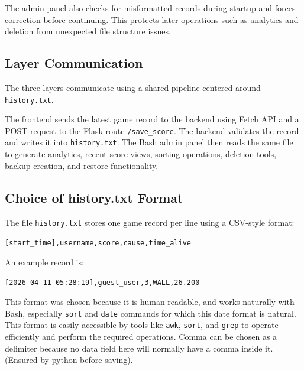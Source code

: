 \documentclass[12pt]{article}
\begin{document}
The admin panel also checks for misformatted records during startup and forces correction before continuing. This protects later operations such as analytics and deletion from unexpected file structure issues.

\subsection{Layer Communication}

The three layers communicate using a shared pipeline centered around \texttt{history.txt}.

The frontend sends the latest game record to the backend using Fetch API and a POST request to the Flask route \texttt{/save\_score}. The backend validates the record and writes it into \texttt{history.txt}. The Bash admin panel then reads the same file to generate analytics, recent score views, sorting operations, deletion tools, backup creation, and restore functionality.

\subsection{Choice of history.txt Format}

The file \texttt{history.txt} stores one game record per line using a CSV-style format:

\texttt{[start\_time],username,score,cause,time\_alive}

An example record is:

\texttt{[2026-04-11 05:28:19],guest\_user,3,WALL,26.200}

This format was chosen because it is human-readable, and works naturally with Bash, especially \texttt{sort} and \texttt{date} commands for which this date format is natural. This format is easily accessible by tools like \texttt{awk}, \texttt{sort}, and \texttt{grep} to operate efficiently and perform the required operations. Comma can be chosen as a delimiter because no data field here will normally have a comma inside it. (Ensured by python before saving).
\end{document}
